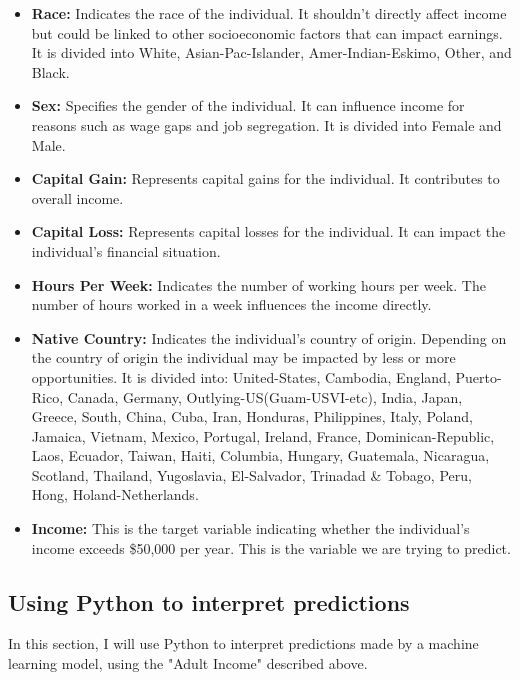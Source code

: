 \documentclass[10pt,journal,compsoc]{IEEEtran}
\begin{document}
\begin{itemize}
    \item \textbf{Race:} Indicates the race of the individual. It shouldn't directly affect income but could be linked to other socioeconomic factors that can impact earnings. It is divided into White, Asian-Pac-Islander, Amer-Indian-Eskimo, Other, and Black.

    \item \textbf{Sex:} Specifies the gender of the individual. It can influence income for reasons such as wage gaps and job segregation. It is divided into Female and Male.

    \item \textbf{Capital Gain:} Represents capital gains for the individual. It contributes to overall income.

    \item \textbf{Capital Loss:} Represents capital losses for the individual. It can impact the individual's financial situation.

    \item \textbf{Hours Per Week:} Indicates the number of working hours per week. The number of hours worked in a week influences the income directly.

    \item \textbf{Native Country:} Indicates the individual's country of origin. Depending on the country of origin the individual may be impacted by less or more opportunities. It is divided into: United-States, Cambodia, England, Puerto-Rico, Canada, Germany, Outlying-US(Guam-USVI-etc), India, Japan, Greece, South, China, Cuba, Iran, Honduras, Philippines, Italy, Poland, Jamaica, Vietnam, Mexico, Portugal, Ireland, France, Dominican-Republic, Laos, Ecuador, Taiwan, Haiti, Columbia, Hungary, Guatemala, Nicaragua, Scotland, Thailand, Yugoslavia, El-Salvador, Trinadad \& Tobago, Peru, Hong, Holand-Netherlands.

    \item \textbf{Income:} This is the target variable indicating whether the individual's income exceeds  \$50,000 per year. This is the variable we are trying to predict.

\end{itemize}

\subsection{Using Python to interpret predictions}
In this section, I will use Python to interpret predictions made by a machine learning model, using the "Adult Income" described above.
\end{document}
